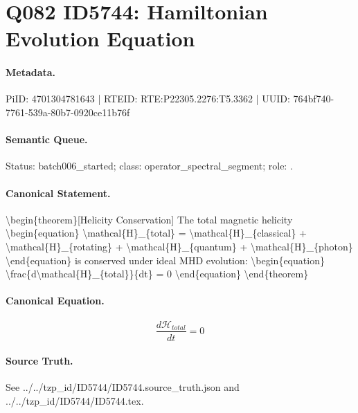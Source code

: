\section*{Q082 ID5744: Hamiltonian Evolution Equation}
\paragraph{Metadata.}
PiID: 4701304781643 | RTEID: RTE:P22305.2276:T5.3362 | UUID: 764bf740-7761-539a-80b7-0920ce11b76f

\paragraph{Semantic Queue.}
Status: batch006\_started; class: operator\_spectral\_segment; role: .

\paragraph{Canonical Statement.}
\textbackslash{}begin\{theorem\}[Helicity Conservation] The total magnetic helicity \textbackslash{}begin\{equation\} \textbackslash{}mathcal\{H\}\_\{total\} = \textbackslash{}mathcal\{H\}\_\{classical\} + \textbackslash{}mathcal\{H\}\_\{rotating\} + \textbackslash{}mathcal\{H\}\_\{quantum\} + \textbackslash{}mathcal\{H\}\_\{photon\} \textbackslash{}end\{equation\} is conserved under ideal MHD evolution: \textbackslash{}begin\{equation\} \textbackslash{}frac\{d\textbackslash{}mathcal\{H\}\_\{total\}\}\{dt\} = 0 \textbackslash{}end\{equation\} \textbackslash{}end\{theorem\}

\paragraph{Canonical Equation.}
\[
\begin{equation} \frac{d\mathcal{H}_{total}}{dt} = 0 \end{equation}
\]

\paragraph{Source Truth.}
See ../../tzp\_id/ID5744/ID5744.source\_truth.json and ../../tzp\_id/ID5744/ID5744.tex.

